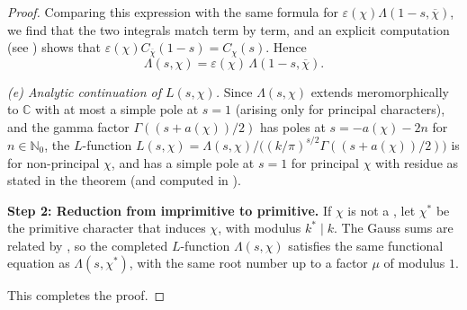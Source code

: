 \begin{proof}
Comparing this expression with the same formula for $\varepsilon(\chi)\Lambda(1 - s, \overline{\chi})$, we find that the two integrals match term by term, and an explicit computation (see ) shows that $\varepsilon(\chi) C_{\overline{\chi}}(1 - s) = C_\chi(s)$. Hence
$$\Lambda(s, \chi) = \varepsilon(\chi) \, \Lambda(1 - s, \overline{\chi}).$$

\medskip
\noindent \emph{(e) Analytic continuation of $L(s, \chi)$.} Since $\Lambda(s, \chi)$ extends meromorphically to $\mathbb{C}$ with at most a simple pole at $s = 1$ (arising only for principal characters), and the gamma factor $\Gamma((s + a(\chi))/2)$ has poles at $s = -a(\chi) - 2n$ for $n \in \mathbb{N}_0$, the $L$-function $L(s, \chi) = \Lambda(s, \chi) / \bigl( (k/\pi)^{s/2} \Gamma((s + a(\chi))/2) \bigr)$ is  for non-principal $\chi$, and has a simple pole at $s = 1$ for principal $\chi$ with residue as stated in the theorem (and computed in ).

\medskip
\noindent \textbf{Step 2: Reduction from imprimitive to primitive.} If $\chi$ is not a , let $\chi^*$ be the primitive character that induces $\chi$, with modulus $k^* \mid k$. The Gauss sums are related by , so the completed $L$-function $\Lambda(s, \chi)$ satisfies the same functional equation as $\Lambda(s, \chi^*)$, with the same root number up to a factor $\mu$ of modulus $1$.

This completes the proof.
\end{proof}
